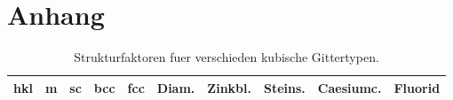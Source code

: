 \newpage
\section{Anhang}\label{sec:Anhang}%
\vspace{-5em}
\begin{table}
		\centering
		\caption{Strukturfaktoren fuer verschieden kubische Gittertypen.}
		\label{tab:struct}
		\begin{tabular}{c c c c c c c c c c}
				\toprule
				hkl & m & sc & bcc & fcc & Diam. & Zinkbl. & Steins. & Caesiumc. & Fluorid \\ 
				\midrule
					
				\bottomrule
		\end{tabular}
\end{table}
\vspace{-5em}
